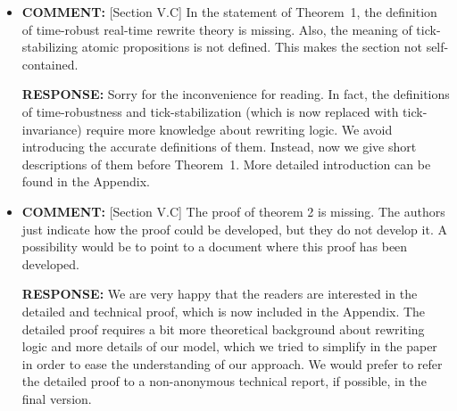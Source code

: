 \documentclass[10pt,journal]{IEEEtran}
\newcommand{\ANSWER}{{\bf RESPONSE: }}
\newcommand{\COMMENT}{{\bf COMMENT: }}
\begin{document}
\begin{itemize}
\item
\COMMENT [Section V.C] In the statement of Theorem~1, the definition
of time-robust real-time rewrite theory is missing. Also, the meaning
of tick-stabilizing atomic propositions is not defined. This makes the
section not self-contained.

\ANSWER Sorry for the inconvenience for reading. In fact, the
definitions of time-robustness and tick-stabilization (which is now
replaced with tick-invariance) require more knowledge about rewriting
logic. We avoid introducing the accurate definitions of them. Instead,
now we give short descriptions of them before Theorem~1. More detailed
introduction can be found in the Appendix.

\item
\COMMENT [Section V.C] The proof of theorem 2 is missing. The authors
just indicate how the proof could be developed, but they do not
develop it. A possibility would be to point to a document where this
proof has been developed.

\ANSWER We are very happy that the readers are interested in the
detailed and technical proof, which is now included in the Appendix.
The detailed proof requires a bit more theoretical background about
rewriting logic and more details of our model, which we tried to
simplify in the paper in order to ease the understanding of our
approach. We would prefer to refer the detailed proof to a
non-anonymous technical report, if possible, in the final version.
\end{itemize}
\end{document}
